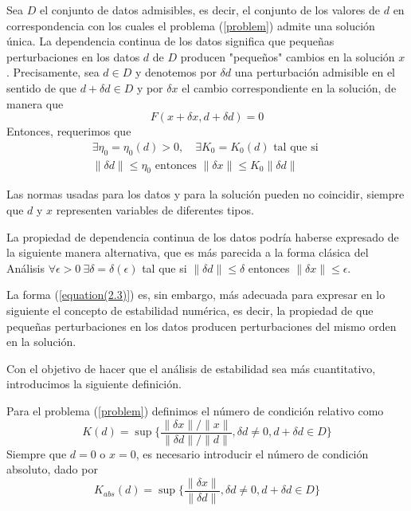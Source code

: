 Sea $D$ el conjunto de datos admisibles, es decir, el conjunto de los valores de $d$ en correspondencia con los cuales el problema (\ref{problem}) admite una solución única. La dependencia continua de los datos significa que pequeñas perturbaciones en los datos $d$ de $D$ producen "pequeños" cambios en la solución $x$. Precisamente, sea $d \in D$ y denotemos por $\delta d$ una perturbación admisible en el sentido de que $d + \delta d \in D$ y por $\delta x$ el cambio correspondiente en la solución, de manera que
\begin{equation}
    F(x + \delta x, d + \delta d) = 0
    \label{equation 2.2}
\end{equation}
Entonces, requerimos que
\begin{multline}
    \exists \eta_0 =\eta_0(d) > 0, \quad \exists K_0 = K_0 (d) \text{ tal que si } \\
     \| \delta d \| \leq \eta_0 \text{ entonces } \| \delta x \| \leq K_0 \| \delta d \|
     \label{equation(2.3)}
\end{multline}

Las normas usadas para los datos y para la solución pueden no coincidir, siempre que $d$ y $x$ representen variables de diferentes tipos.

\begin{remark}
    La propiedad de dependencia continua de los datos podría haberse expresado de la siguiente manera alternativa, que es más parecida a la forma clásica del Análisis $\forall \epsilon > 0\ \exists \delta = \delta (\epsilon)$ tal que si $\| \delta d \| \leq \delta$ entonces $\| \delta x \| \leq \epsilon$.
    
    La forma (\ref{equation(2.3)}) es, sin embargo, más adecuada para expresar en lo siguiente el concepto de estabilidad numérica, es decir, la propiedad de que pequeñas perturbaciones en los datos producen perturbaciones del mismo orden en la solución.
\end{remark}

Con el objetivo de hacer que el análisis de estabilidad sea más cuantitativo, introducimos la siguiente definición.

\begin{definition}
    Para el problema (\ref{problem}) definimos el número de condición relativo como
    \begin{equation}
        K(d) = \sup\{ \frac{\| \delta x \| / \| x \|}{\| \delta d \| / \|d \|}, \delta d \neq 0, d + \delta d \in D \}
        \label{equation 2.4}
    \end{equation}
    Siempre que $d = 0$ o $x = 0$, es necesario introducir el número de condición absoluto, dado por
    \begin{equation}
        K_{abs}(d) = \sup \{ \frac{ \| \delta x \|}{ \| \delta d \|}, \delta d \neq 0, d + \delta d \in D \}
        \label{equation 2.5}
    \end{equation}
\end{definition}

